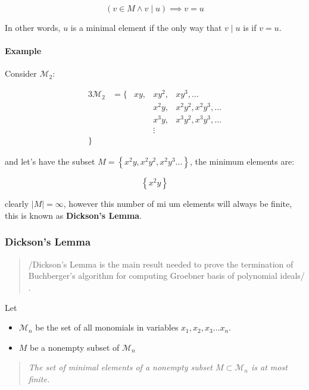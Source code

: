 \documentclass[a4paper,11pt,twoside]{article}
\begin{document}
\[
    \left(v \in M \land v \mid u\right) \implies v = u
    \]

In other words, \(u\) is a minimal element if the only way that \(v
    \mid u\) is if \(v = u\).


\paragraph{Example}
\label{sec:org5ec9ee3}

Consider \(\mathcal{M}_2\):

\begin{alignat}{3}
  \mathcal{M}_2 &= \{&x  y, &x  y^2, &x  y^3, \ldots         \\
                &    &      &x^2y,   &x^2y^2, x^2y^3, \ldots \\
                &    &      &x^3y,   &x^3y^2, x^3y^3, \ldots \\
                &    &      & \vdots &                       \\
		  \}
\end{alignat}

and let's have the subset \(M = \left\{ x^2y, x^2y^2, x^2y^3 \ldots
     \right\}\), the minimum elements are:

\[
           \left\{x^2y\right\}
     \]


clearly \(\left\lvert M \right\rvert = \infty\), however this number of
mi \centernot\implies um elements will always be finite, this is known as
\textbf{Dickson's Lemma}.

\subsubsection{Dickson's Lemma}
\label{sec:org3d0dad4}

\begin{quote}
/Dickson's Lemma is the main result needed to prove the termination
of Buchberger's algorithm for computing Groebner basis of polynomial
ideals/ \cite{martin-mateosFormalProofDickson2003}.
\end{quote}

Let
\begin{itemize}
\item \(\mathcal{M}_n\) be the set of all monomials in variables \(x_1, x_2, x_3 \ldots x_n\).
\item \(M\) be a nonempty subset of \(\mathcal{M}_n\)
\end{itemize}

\begin{quote}
\emph{The set of minimal elements of a nonempty subset \(M \subset
    \mathcal{M}_n\) is at most finite.}
\end{quote}
\end{document}
